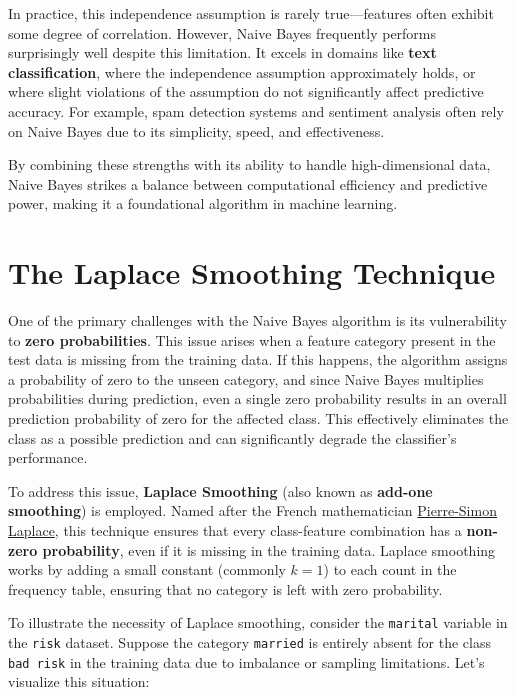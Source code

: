 \documentclass[
]{book}
\newcommand{\passthrough}[1]{#1}
\theoremstyle{definition}
\theoremstyle{definition}
\theoremstyle{definition}
\theoremstyle{definition}
\theoremstyle{remark}
\begin{document}
In practice, this independence assumption is rarely true---features often exhibit some degree of correlation. However, Naive Bayes frequently performs surprisingly well despite this limitation. It excels in domains like \textbf{text classification}, where the independence assumption approximately holds, or where slight violations of the assumption do not significantly affect predictive accuracy. For example, spam detection systems and sentiment analysis often rely on Naive Bayes due to its simplicity, speed, and effectiveness.

By combining these strengths with its ability to handle high-dimensional data, Naive Bayes strikes a balance between computational efficiency and predictive power, making it a foundational algorithm in machine learning.

\section{The Laplace Smoothing Technique}\label{the-laplace-smoothing-technique}

One of the primary challenges with the Naive Bayes algorithm is its vulnerability to \textbf{zero probabilities}. This issue arises when a feature category present in the test data is missing from the training data. If this happens, the algorithm assigns a probability of zero to the unseen category, and since Naive Bayes multiplies probabilities during prediction, even a single zero probability results in an overall prediction probability of zero for the affected class. This effectively eliminates the class as a possible prediction and can significantly degrade the classifier's performance.

To address this issue, \textbf{Laplace Smoothing} (also known as \textbf{add-one smoothing}) is employed. Named after the French mathematician \href{https://en.wikipedia.org/wiki/Pierre-Simon_Laplace}{Pierre-Simon Laplace}, this technique ensures that every class-feature combination has a \textbf{non-zero probability}, even if it is missing in the training data. Laplace smoothing works by adding a small constant (commonly \(k = 1\)) to each count in the frequency table, ensuring that no category is left with zero probability.

To illustrate the necessity of Laplace smoothing, consider the \passthrough{\lstinline!marital!} variable in the \passthrough{\lstinline!risk!} dataset. Suppose the category \passthrough{\lstinline!married!} is entirely absent for the class \passthrough{\lstinline!bad risk!} in the training data due to imbalance or sampling limitations. Let's visualize this situation:
\end{document}
